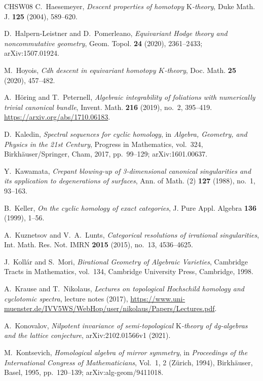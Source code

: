 \documentclass{amsart}
\theoremstyle{plain}
\theoremstyle{definition}
\newcommand{\K}{\mathrm{K}}
\begin{document}
\begin{thebibliography}{CHSW08}
C.~Haesemeyer, \emph{Descent properties of homotopy $\K$-theory}, Duke Math. J. \textbf{125} (2004), 589--620.

D.~Halpern-Leistner and D.~Pomerleano,
\emph{Equivariant Hodge theory and noncommutative geometry}, Geom. Topol. \textbf{24} (2020), 2361--2433; arXiv:1507.01924.

M.~Hoyois,
\emph{Cdh descent in equivariant homotopy $K$-theory}, Doc. Math. \textbf{25} (2020), 457--482.

A.~H\"oring and T.~Peternell,
\emph{Algebraic integrability of foliations with numerically trivial canonical bundle}, Invent. Math. \textbf{216} (2019), no.~2, 395--419.
\url{https://arxiv.org/abs/1710.06183}.

D.~Kaledin,
\emph{Spectral sequences for cyclic homology}, in \emph{Algebra, Geometry, and Physics in the 21st Century}, Progress in Mathematics, vol.~324, Birkh\"auser/Springer, Cham, 2017, pp.~99--129;
arXiv:1601.00637.

Y.~Kawamata,
\emph{Crepant blowing-up of 3-dimensional canonical singularities and its application to degenerations of surfaces}, Ann. of Math. (2) \textbf{127} (1988), no.~1, 93--163.

B.~Keller, \emph{On the cyclic homology of exact categories}, J. Pure Appl. Algebra \textbf{136} (1999), 1--56.


A.~Kuznetsov and V.~A.~Lunts,
\emph{Categorical resolutions of irrational singularities}, Int. Math. Res. Not. IMRN \textbf{2015} (2015), no.~13, 4536--4625.

J.~Koll\'ar and S.~Mori,
\emph{Birational Geometry of Algebraic Varieties}, Cambridge Tracts in Mathematics, vol.~134, Cambridge University Press, Cambridge, 1998.

A.~Krause and T.~Nikolaus,
\emph{Lectures on topological Hochschild homology and cyclotomic spectra}, lecture notes (2017),
\url{https://www.uni-muenster.de/IVV5WS/WebHop/user/nikolaus/Papers/Lectures.pdf}.

A.~Konovalov,
\emph{Nilpotent invariance of semi-topological $\K$-theory of dg-algebras and the lattice conjecture}, arXiv:2102.01566v1 (2021).

M.~Kontsevich,
\emph{Homological algebra of mirror symmetry}, in \emph{Proceedings of the International Congress of Mathematicians}, Vol.~1, 2 (Z\"urich, 1994), Birkh\"auser, Basel, 1995, pp.~120--139;
arXiv:alg-geom/9411018.


\end{thebibliography}
\end{document}
